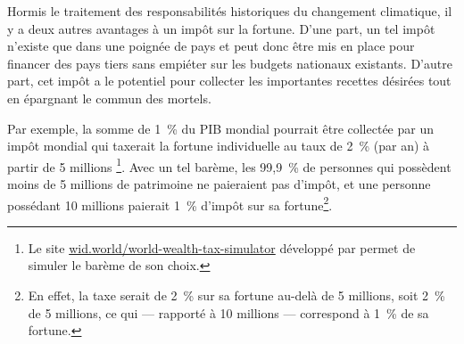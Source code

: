 \documentclass[a5paper,french,openany]{memoir}
\begin{document}
Hormis le traitement des responsabilités historiques du changement climatique, il y a deux autres avantages à un impôt sur la fortune. D'une part, un tel impôt n'existe que dans une poignée de pays et peut donc être mis en place pour financer des pays tiers sans empiéter sur les budgets nationaux existants. D'autre part, cet impôt a le potentiel pour collecter %
les importantes recettes désirées tout en épargnant le commun des mortels. %

Par exemple, la somme de 1~\% du PIB mondial pourrait être collectée par un impôt mondial qui taxerait la fortune individuelle au taux de 2~\% (par an) à partir de 5 millions%
\footnote{
Le site \href{https://wid.world/world-wealth-tax-simulator/}{wid.world/world-wealth-tax-simulator} développé par \cite{chancel_world_2022} permet de simuler le barème de son choix.}. %
Avec un tel barème, les 99,9~\% de personnes qui possèdent moins de 5 millions de patrimoine ne paieraient pas d'impôt, et une personne possédant 10 millions paierait 1~\% d'impôt sur sa fortune\footnote{En effet, la taxe serait de 2~\% sur sa fortune au-delà de 5 millions, soit 2~\% de 5 millions, ce qui --- rapporté à 10 millions --- correspond à 1~\% de sa fortune.}. 
\end{document}
